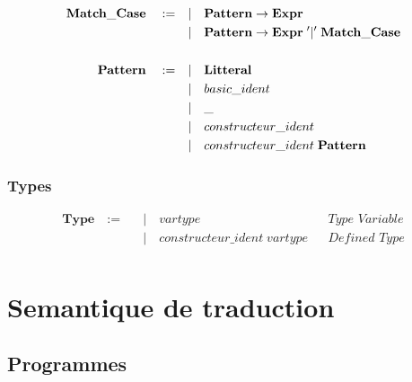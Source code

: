 \documentclass[
  12pt,
]{article}
\begin{document}
\begin{align*}
  \bf{Match\_Case}  \quad :=  \quad & |\quad  \textbf{Pattern} \rightarrow  \textbf{Expr}                         \\
                                    & |\quad \textbf{Pattern} \rightarrow  \textbf{Expr}\; '|'\; \bf{Match\_Case} \\
  \\
  \textbf{Pattern} \quad :=  \quad & |\quad \textbf{Litteral}                                                    \\
                                    & |\quad basic\_ident                                                         \\
                                    & |\quad \_                                                                   \\
                                    & |\quad constructeur\_ident                                                  \\
                                    & |\quad constructeur\_ident \; \textbf{Pattern}                              \\
\end{align*}

\hypertarget{types-1}{%
  \subsubsection{Types}\label{types-1}}

\begin{align*}
  \textbf{Type}    \quad :=  \quad 
                                   & |\quad vartype                                  &  & \textit{Type Variable}           \\
                                   & |\quad constructeur\_ident \; vartype                             &  & \textit{Defined Type} \\
\end{align*} 

\hypertarget{semantique-de-traduction}{%
  \section{Semantique de traduction}\label{semantique-de-traduction}}

\hypertarget{programmes-1}{%
  \subsection{Programmes}\label{programmes-1}}
\end{document}

